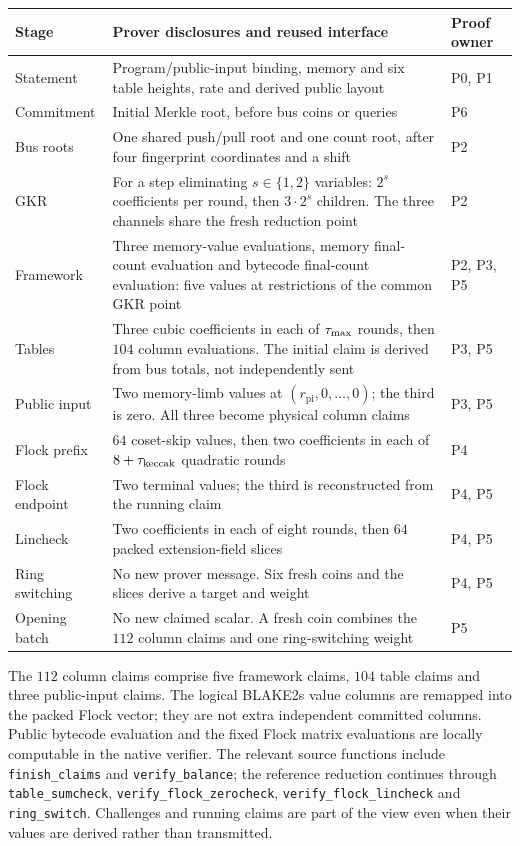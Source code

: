 \begin{center}
\small
\begin{tabular}{@{}p{.16\linewidth}p{.57\linewidth}p{.17\linewidth}@{}}
\toprule
Stage & Prover disclosures and reused interface & Proof owner \\
\midrule
Statement & Program/public-input binding, memory and six table heights, rate and derived public layout & P0, P1 \\
Commitment & Initial Merkle root, before bus coins or queries & P6 \\
Bus roots & One shared push/pull root and one count root, after four fingerprint coordinates and a shift & P2 \\
GKR & For a step eliminating $s\in\{1,2\}$ variables: $2^s$ coefficients per round, then $3\cdot2^s$ children. The three channels share the fresh reduction point & P2 \\
Framework & Three memory-value evaluations, memory final-count evaluation and bytecode final-count evaluation: five values at restrictions of the common GKR point & P2, P3, P5 \\
Tables & Three cubic coefficients in each of $\tau_{\max}$ rounds, then $104$ column evaluations. The initial claim is derived from bus totals, not independently sent & P3, P5 \\
Public input & Two memory-limb values at $(r_{\mathrm{pi}},0,\ldots,0)$; the third is zero. All three become physical column claims & P3, P5 \\
Flock prefix & $64$ coset-skip values, then two coefficients in each of $8+\tau_{\mathrm{keccak}}$ quadratic rounds & P4 \\
Flock endpoint & Two terminal values; the third is reconstructed from the running claim & P4, P5 \\
Lincheck & Two coefficients in each of eight rounds, then $64$ packed extension-field slices & P4, P5 \\
Ring switching & No new prover message. Six fresh coins and the slices derive a target and weight & P4, P5 \\
Opening batch & No new claimed scalar. A fresh coin combines the $112$ column claims and one ring-switching weight & P5 \\
\bottomrule
\end{tabular}
\end{center}

The $112$ column claims comprise five framework claims, $104$ table claims and three public-input claims. The logical BLAKE2s value columns are remapped into the packed Flock vector; they are not extra independent committed columns. Public bytecode evaluation and the fixed Flock matrix evaluations are locally computable in the native verifier. The relevant source functions include \texttt{finish\_claims} and \texttt{verify\_balance}; the reference reduction continues through \nolinkurl{table_sumcheck}, \nolinkurl{verify_flock_zerocheck}, \nolinkurl{verify_flock_lincheck} and \nolinkurl{ring_switch}. Challenges and running claims are part of the view even when their values are derived rather than transmitted.

